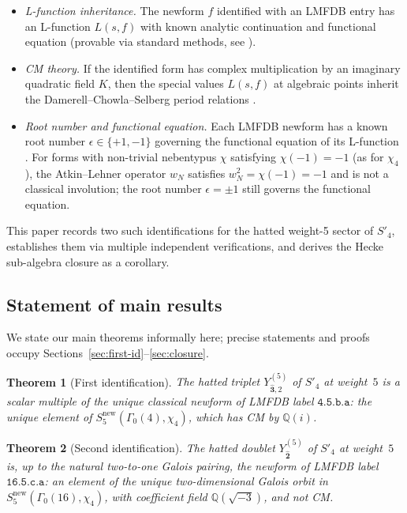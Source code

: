 \documentclass[12pt]{amsart}
\newtheorem{theorem}{Theorem}[section]
\theoremstyle{definition}
\newcommand{\Q}{\mathbb{Q}}
\newcommand{\Gam}{\Gamma}
\newcommand{\lmfdb}[1]{\texttt{#1}}  %
\newcommand{\hhat}[1]{\widehat{\mathbf{#1}}}  %
\begin{document}
\begin{itemize}
  \item \emph{L-function inheritance.}  The newform $f$ identified with
    an LMFDB entry has an L-function $L(s,f)$ with known analytic
    continuation and functional equation (provable via standard methods,
    see \cite{DiamondShurman}).
  \item \emph{CM theory.}  If the identified form has complex multiplication
    by an imaginary quadratic field $K$, then the special values
    $L(s,f)$ at algebraic points inherit the Damerell--Chowla--Selberg
    period relations \cite{Damerell71,ChowlaSelberg67}.
  \item \emph{Root number and functional equation.}
    Each LMFDB newform has a known root number $\epsilon\in\{+1,-1\}$
    governing the functional equation of its L-function
    \cite{AtkinLehner70,DiamondShurman}.
    For forms with non-trivial nebentypus $\chi$ satisfying $\chi(-1)=-1$
    (as for $\chi_4$), the Atkin--Lehner operator $w_N$ satisfies
    $w_N^2 = \chi(-1) = -1$ and is not a classical involution; the root
    number $\epsilon = \pm 1$ still governs the functional equation.
\end{itemize}

This paper records two such identifications for the hatted weight-5
sector of $S'_4$, establishes them via multiple independent verifications,
and derives the Hecke sub-algebra closure as a corollary.

\subsection{Statement of main results}

We state our main theorems informally here; precise statements and proofs
occupy Sections~\ref{sec:first-id}--\ref{sec:closure}.

\begin{theorem}[First identification]\label{thm:first}
  The hatted triplet $Y_{\hhat{3},2}^{(5)}$ of $S'_4$ at weight~$5$
  is a scalar multiple of the unique classical newform of LMFDB label
  $\lmfdb{4.5.b.a}$: the unique element of
  $S_5^{\mathrm{new}}(\Gam_0(4),\chi_4)$,
  which has CM by $\Q(i)$.
\end{theorem}

\begin{theorem}[Second identification]\label{thm:second}
  The hatted doublet $Y_{\hhat{2}}^{(5)}$ of $S'_4$ at weight~$5$
  is, up to the natural two-to-one Galois pairing, the newform of
  LMFDB label $\lmfdb{16.5.c.a}$: an element of the unique
  two-dimensional Galois orbit in $S_5^{\mathrm{new}}(\Gam_0(16),\chi_4)$,
  with coefficient field $\Q(\sqrt{-3})$, and \emph{not} CM.
\end{theorem}
\end{document}
